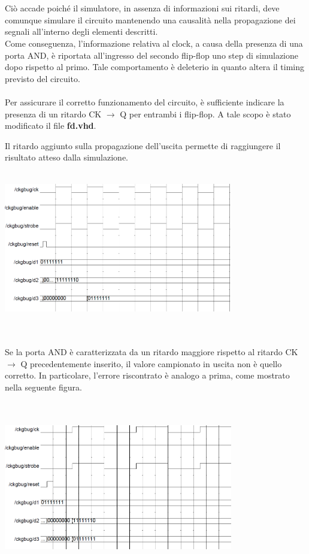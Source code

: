 \documentclass[11pt,  english, makeidx, a4paper, titlepage, oneside]{book}
\newenvironment{listato}{\footnotesize} {\normalsize }
\begin{document}
\\\\
Ciò accade poiché il simulatore, in assenza di informazioni sui ritardi, deve comunque simulare il circuito mantenendo una causalità nella propagazione dei segnali all'interno degli elementi descritti.
\\
Come conseguenza, l'informazione relativa al clock, a causa della presenza di una porta AND, è riportata all'ingresso del secondo flip-flop uno step di simulazione dopo rispetto al primo. Tale comportamento è deleterio in quanto altera il timing previsto del circuito.
\\\\
Per assicurare il corretto funzionamento del circuito, è sufficiente indicare la presenza di un ritardo CK $\rightarrow$ Q per entrambi i flip-flop. A tale scopo è stato modificato il file \textbf{fd.vhd}.
\begin{center}
\begin{listato}
	\centerline{}
\end{listato}
\end{center}
Il ritardo aggiunto sulla propagazione dell'uscita permette di raggiungere il risultato atteso dalla simulazione.
\\\\
\centerline{\includegraphics[width=10cm]{./img/Lab_3/clk_bug_resolved.png}}
\\\\
Se la porta AND è caratterizzata da un ritardo maggiore rispetto al ritardo CK $\rightarrow$ Q precedentemente inserito, il valore campionato in uscita non è quello corretto. In particolare, l'errore riscontrato è analogo a prima, come mostrato nella seguente figura.
\\\\\\
\centerline{\includegraphics[width=10cm]{./img/Lab_3/clk_bug_delay.png}}
\newpage
\end{document}
